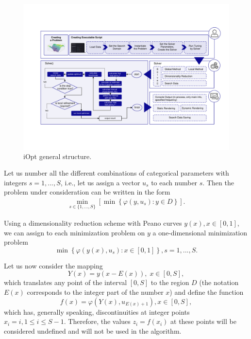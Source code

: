 \documentclass[iicol]{sn-jnl}
\theoremstyle{thmstyleone}%
\theoremstyle{thmstyletwo}%
\theoremstyle{thmstylethree}%
\begin{document}
\begin{figure}[t]
\centering
\includegraphics[width=1.0\textwidth]{scheme.pdf}
\caption{iOpt general structure.} \label{fig_iOpt}
\end{figure}

Let us number all the different combinations of categorical parameters with integers $s = 1,...,S$, i.e., let us assign a vector $u_s$ to each number $s$. Then the problem under consideration can be written in the form
\begin{gather}\label{problem_is}
 \min_{s\in\{1,...,S\}}\left[\min{\left\{ \varphi(y,u_s) : y\in D \right\}}\right].
\end{gather}

Using a dimensionality reduction scheme with Peano curves $y(x), x\in [0,1]$,  we can assign to each minimization problem on $y$ a one-dimensional minimization problem
\begin{equation}\label{fi_s}
 \min{\left\{ \varphi(y(x),u_s): x \in [0,1] \right\}}, s = 1,...,S.
\end{equation}

Let us now consider the mapping
\[
Y(x)=y(x-E(x)), \; x\in[0,S],
\]
which translates any point of the interval $[0,S]$ to the region $D$ (the notation $E(x)$ corresponds to the integer part of the number $x$) and define the function
\begin{equation}\label{f}
f(x) = \varphi(Y(x),u_{E(x)+1}), x\in[0,S],
\end{equation}
which has, generally speaking, discontinuities at integer points $x_i = i, 1 \leq i \leq S-1$.
Therefore, the values $z_i = f(x_i)$ at these points will be considered undefined and will not be used in the algorithm.
\end{document}

